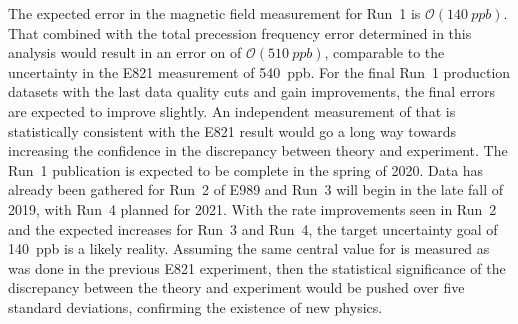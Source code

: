The expected error in the magnetic field measurement for Run~1 is $\mathcal{O}(\SI{140}{ppb})$. That combined with the total precession frequency error determined in this analysis would result in an error on \amu of $\mathcal{O}(\SI{510}{ppb})$, comparable to the uncertainty in the E821 measurement of \SI{540}{ppb}. For the final Run~1 production datasets with the last data quality cuts and gain improvements, the final errors are expected to improve slightly. An independent measurement of \amu that is statistically consistent with the E821 result would go a long way towards increasing the confidence in the discrepancy between theory and experiment. The Run~1 publication is expected to be complete in the spring of 2020. Data has already been gathered for Run~2 of E989 and Run~3 will begin in the late fall of 2019, with Run~4 planned for 2021. With the rate improvements seen in Run~2 and the expected increases for Run~3 and Run~4, the target uncertainty goal of \SI{140}{ppb} is a likely reality. Assuming the same central value for \amu is measured as was done in the previous E821 experiment, then the statistical significance of the discrepancy between the theory and experiment would be pushed over five standard deviations, confirming the existence of new physics.






